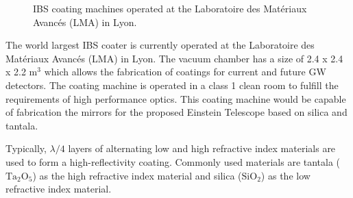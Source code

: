 {\begin{figure}[H]
\begin{center}
\caption{IBS coating machines operated at the Laboratoire des Mat\'eriaux Avanc\'es (LMA) in Lyon.}
\end{center}
\end{figure}
The world largest IBS coater is currently operated at the Laboratoire des Mat\'eriaux Avanc\'es (LMA) in Lyon. The vacuum chamber has a size of 2.4 x 2.4 x 2.2 $\mathrm{m^3}$ which allows the fabrication of coatings for current and future GW detectors. The coating machine is operated in a class 1 clean room to fulfill the requirements of high performance optics. This coating machine would be capable of fabrication the mirrors for the proposed Einstein Telescope based on silica and tantala.
}


Typically, $\lambda/4$ layers of alternating low and high refractive index materials are used to form a high-reflectivity coating. Commonly used materials are tantala ($\mathrm{Ta_2O_5}$) as the high refractive index material and silica ($\mathrm{SiO_2}$) as the low refractive index material.

